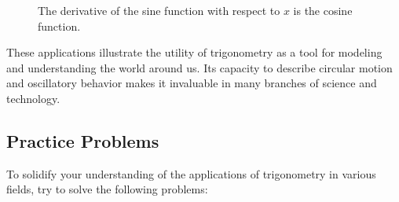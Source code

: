 \documentclass[a4paper,12pt]{book}
\newcounter{problem}
\begin{document}
\begin{figure}[h]
\centering
{}
\caption{The derivative of the sine function with respect to $x$ is the cosine function.}
\label{fig:derivative_sine}
\end{figure}

These applications illustrate the utility of trigonometry as a tool for modeling and understanding the world around us. Its capacity to describe circular motion and oscillatory behavior makes it invaluable in many branches of science and technology.

\subsection{Practice Problems}
\label{subsec:practice_problems}

To solidify your understanding of the applications of trigonometry in various fields, try to solve the following problems:
\end{document}
